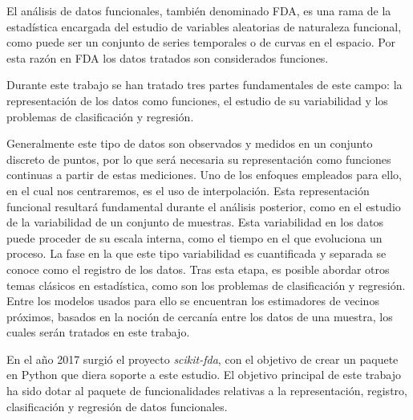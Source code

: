 El análisis de datos funcionales, también denominado FDA, es una rama de la
estadística encargada del estudio de variables aleatorias de naturaleza
funcional, como puede ser un conjunto de series temporales o de curvas en el
espacio. Por esta razón en FDA los datos tratados son considerados funciones.

Durante este trabajo se han tratado tres partes fundamentales de este campo:
la representación de los datos como funciones, el estudio de su variabilidad
y los problemas de clasificación y regresión.

Generalmente este tipo de datos son observados y medidos en un conjunto
discreto de puntos, por lo que será necesaria su representación como
funciones continuas a partir de estas mediciones.
Uno de los enfoques empleados para ello, en el cual nos centraremos, es el uso de interpolación.
Esta representación funcional resultará fundamental durante el análisis posterior,
como en el estudio de la variabilidad de un conjunto de muestras.
Esta variabilidad en los datos
puede proceder de su escala interna, como el tiempo en el que evoluciona un
proceso. La fase en la que este tipo variabilidad es cuantificada y separada se
conoce como el registro de los datos. Tras esta etapa, es posible
abordar otros temas clásicos en estadística, como son los problemas de
clasificación y regresión. Entre los modelos usados para ello se encuentran los
estimadores de vecinos próximos, basados en la noción de cercanía entre los
datos de una muestra, los cuales serán tratados en este trabajo.

En el año 2017 surgió el proyecto \textit{scikit-fda}, con el objetivo de crear
un paquete en Python que diera soporte a este estudio. El objetivo principal
de este trabajo ha sido dotar al paquete de funcionalidades relativas a la
representación, registro, clasificación y regresión de datos funcionales.


